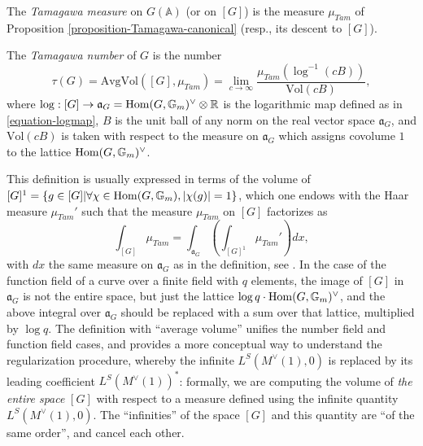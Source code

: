 	
	
	
	
\begin{definition}
\label{definition-Tamagawa-measure-number}
The {\it Tamagawa measure} on $G(\mathbb A)$ (or on $[G]$) is the measure $\mu_{Tam}$ of Proposition \ref{proposition-Tamagawa-canonical} (resp., its descent to $[G]$).  
		
The {\it Tamagawa number} of $G$ is the number
\begin{equation}
\label{equation-Tamagawa-number}
\tau(G) = \text{AvgVol}([G],\mu_{Tam}) = \lim_{c\to\infty} \frac{\mu_{Tam}(\log^{-1}(cB))}{\text{Vol}(cB)},
\end{equation}
where $\log: [G] \to \mathfrak a_G = \mathop{\rm Hom}\nolimits(G, \mathbb G_m)^\vee \otimes \mathbb R$ is the logarithmic map defined as in \eqref{equation-logmap}, $B$ is the unit ball of any norm on the real vector space $\mathfrak a_G$, and $\text{Vol}(cB)$ is taken with respect to the measure on $\mathfrak a_G$ which assigns covolume $1$ to the lattice $\mathop{\rm Hom}\nolimits(G, \mathbb G_m)^\vee$. 
\end{definition}
	
	
\begin{remark}
\label{remark-Tamagawa-measure}
		This definition is usually expressed in terms of the volume of $[G]^1=\{g\in [G]| \forall \chi\in \mathop{\rm Hom}\nolimits(G, \mathbb G_m), |\chi(g)|=1\}$, which one endows with the Haar measure $\mu_{Tam}'$ such that the measure $\mu_{Tam}$ on $[G]$ factorizes as
		$$ \int_{[G]} \mu_{Tam} = \int_{\mathfrak a_G} (\int_{[G]^1} \mu_{Tam}') dx,$$
		with $dx$ the same measure on $\mathfrak a_G$ as in the definition, see \cite{Oesterle-Tamagawa}. In the case of the function field of a curve over a finite field with $q$ elements, the image of $[G]$ in $\mathfrak a_G$ is not the entire space, but just the lattice $\log q \cdot \mathop{\rm Hom}\nolimits(G, \mathbb G_m)^\vee$, and the above integral over $\mathfrak a_G$ should be replaced with a sum over that lattice, multiplied by $\log q$. The definition with ``average volume'' unifies the number field and function field cases, and provides a more conceptual way to understand the regularization procedure, whereby the infinite $L^S(M^\vee(1),0)$ is replaced by its leading coefficient $L^S(M^\vee(1))^*$: formally, we are computing the volume of \emph{the entire space} $[G]$ with respect to a measure defined using the infinite quantity $L^S(M^\vee(1),0)$. The ``infinities'' of the space $[G]$ and this quantity are ``of the same order'', and cancel each other.
\end{remark}
 
